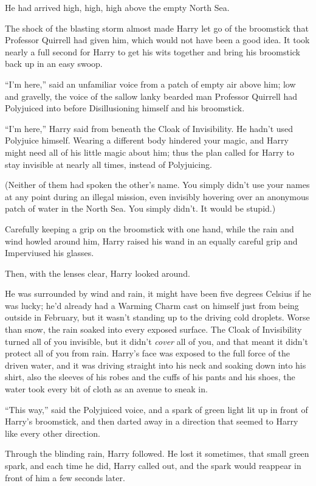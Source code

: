 He had arrived high, high, high above the empty North Sea.

The shock of the blasting storm almost made Harry let go of the broomstick that Professor Quirrell had given him, which would not have been a good idea. It took nearly a full second for Harry to get his wits together and bring his broomstick back up in an easy swoop.

``I'm here,'' said an unfamiliar voice from a patch of empty air above him; low and gravelly, the voice of the sallow lanky bearded man Professor Quirrell had Polyjuiced into before Disillusioning himself and his broomstick.

``I'm here,'' Harry said from beneath the Cloak of Invisibility. He hadn't used Polyjuice himself. Wearing a different body hindered your magic, and Harry might need all of his little magic about him; thus the plan called for Harry to stay invisible at nearly all times, instead of Polyjuicing.

(Neither of them had spoken the other's name. You simply didn't use your names at any point during an illegal mission, even invisibly hovering over an anonymous patch of water in the North Sea. You simply didn't. It would be stupid.)

Carefully keeping a grip on the broomstick with one hand, while the rain and wind howled around him, Harry raised his wand in an equally careful grip and Imperviused his glasses.

Then, with the lenses clear, Harry looked around.

He was surrounded by wind and rain, it might have been five degrees Celsius if he was lucky; he'd already had a Warming Charm cast on himself just from being outside in February, but it wasn't standing up to the driving cold droplets. Worse than snow, the rain soaked into every exposed surface. The Cloak of Invisibility turned all of you invisible, but it didn't \emph{cover} all of you, and that meant it didn't protect all of you from rain. Harry's face was exposed to the full force of the driven water, and it was driving straight into his neck and soaking down into his shirt, also the sleeves of his robes and the cuffs of his pants and his shoes, the water took every bit of cloth as an avenue to sneak in.

``This way,'' said the Polyjuiced voice, and a spark of green light lit up in front of Harry's broomstick, and then darted away in a direction that seemed to Harry like every other direction.

Through the blinding rain, Harry followed. He lost it sometimes, that small green spark, and each time he did, Harry called out, and the spark would reappear in front of him a few seconds later.

